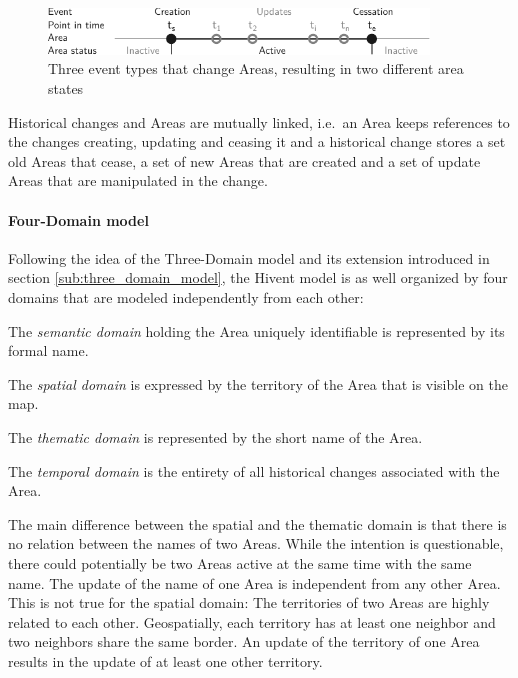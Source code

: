 \begin{figure}[H]
  \vspace{1em}
  \centering
  \includegraphics[width=0.9\textwidth]{graphics/development/hivent_model/area_states}
  \caption{Three event types that change Areas, resulting in two different area states}
  \label{fig:area_states}
\end{figure}

Historical changes and Areas are mutually linked, i.e.\ an Area keeps references to the changes creating, updating and ceasing it and a historical change stores a set old Areas that cease, a set of new Areas that are created and a set of update Areas that are manipulated in the change.


\paragraph{Four-Domain model} %
\label{par:four_domain_model}

Following the idea of the Three-Domain model and its extension introduced in section \ref{sub:three_domain_model}, the Hivent model is as well organized by four domains that are modeled independently from each other:

\begin{compactitem}
  \item The \emph{semantic domain} holding the Area uniquely identifiable is represented by its formal name.
  \item The \emph{spatial domain} is expressed by the territory of the Area that is visible on the map.
  \item The \emph{thematic domain} is represented by the short name of the Area.
  \item The \emph{temporal domain} is the entirety of all historical changes associated with the Area.
\end{compactitem}

The main difference between the spatial and the thematic domain is that there is no relation between the names of two Areas. While the intention is questionable, there could potentially be two Areas active at the same time with the same name. The update of the name of one Area is independent from any other Area. This is not true for the spatial domain: The territories of two Areas are highly related to each other. Geospatially, each territory has at least one neighbor and two neighbors share the same border. An update of the territory of one Area results in the update of at least one other territory.

